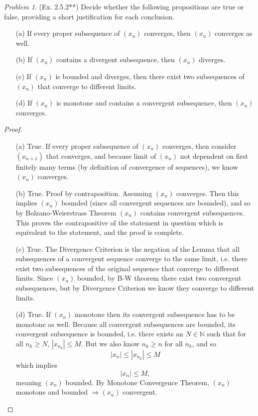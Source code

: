 \documentclass[11pt,twoside, reqno]{amsart}
\theoremstyle{remark}
\newtheorem{Prob}{Problem}
\def\N{\mathbb N}
\renewcommand{\implies}{\Rightarrow}
\begin{document}
\begin{Prob}(Ex. 2.5.2**) Decide whether the following propositions are true or false, providing a short justification for each conclusion.
\begin{enumerate}
    \item [(a)] If every proper subsequence of $(x_n)$ converges, then $(x_n)$ converges as well.
    \item [(b)] If $(x_n)$ contains a divergent subsequence, then $(x_n)$ diverges.
    \item [(c)] If $(x_n)$ is bounded and diverges, then there exist two subsequences of $(x_n)$ that converge to different limits.
    \item [(d)] If $(x_n)$ is monotone and contains a convergent subsequence, then $(x_n)$ converges.
\end{enumerate}
\end{Prob}

\begin{proof}
\begin{enumerate}
    \item [(a)] True. If every proper subsequence of $(x_n)$ converges, then consider $(x_{n+1})$ that converges, and because limit of $(x_n)$ not dependent on first finitely many terms (by definition of convergence of sequences), we know $(x_n)$ converges.
    \item [(b)] True. Proof by contraposition. Assuming $(x_n)$ converges. Then this implies $(x_n)$ bounded (since all convergent sequences are bounded), and so by Bolzano-Weierstrass Theorem $(x_n)$ contains convergent subsequences. This proves the contrapositive of the statement in question which is equivalent to the statement, and the proof is complete.
    \item [(c)] True. The Divergence Criterion is the negation of the Lemma that all subsequences of a convergent sequence converge to the same limit, i.e. there exist two subsequences of the original sequence that converge to different limits. Since $(x_n)$ bounded, by B-W theorem there exist two convergent subsequences, but by Divergence Criterion we know they converge to different limits.
    \item [(d)] True. If $(x_n)$ monotone then its convergent subsequence has to be monotone as well. 
    Because all convergent subsequences are bounded, its convergent subsequence is bounded, i.e. there exists an $N \in \N$ such that for all $n_k \geq N$, $|x_{n_k}| \leq M$. But we also know $n_k \geq n$ for all $n_k$, and so
    $$
        |x_n| \leq |x_{n_k}| \leq M
    $$
    which implies
    $$
        |x_n| \leq M,
    $$
    meaning $(x_n)$ bounded. By Monotone Convergence Theorem, $(x_n)$ monotone and bounded $\implies (x_n)$ convergent.
\end{enumerate}

\end{proof}
\end{document}

